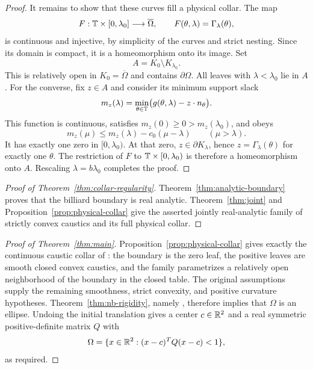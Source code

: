 \begin{proof}
It remains to show that these curves fill a physical collar.
The map
\[
 F:\mathbb{T}\times[0,\lambda_0]\longrightarrow\overline\Omega,
 \qquad F(\theta,\lambda)=\Gamma_\lambda(\theta),
\]
is continuous and injective, by simplicity of the curves and strict
nesting. Since its domain is compact, it is a homeomorphism onto its
image. Set
\[
 A=K_0\setminus K_{\lambda_0}.
\]
This is relatively open in \(K_0=\overline\Omega\) and contains
\(\partial\Omega\). All leaves with \(\lambda<\lambda_0\) lie in \(A\).
For the converse, fix \(z\in A\) and consider its minimum support slack
\[
 m_z(\lambda)
   =\min_{\theta\in\mathbb{T}}
      \bigl(g(\theta,\lambda)-z\cdot n_\theta\bigr).
\]
This function is continuous, satisfies
\(m_z(0)\geq0>m_z(\lambda_0)\), and obeys
\[
 m_z(\mu)\leq m_z(\lambda)-c_0(\mu-\lambda)
 \qquad(\mu>\lambda).
\]
It has exactly one zero in \([0,\lambda_0)\).
At that zero, \(z\in\partial K_\lambda\), hence
\(z=\Gamma_\lambda(\theta)\) for exactly one \(\theta\).
The restriction of \(F\) to \(\mathbb{T}\times[0,\lambda_0)\) is therefore a
homeomorphism onto \(A\). Rescaling \(\lambda=b\lambda_0\) completes
the proof.
\end{proof}

\begin{proof}[Proof of Theorem~\ref{thm:collar-regularity}]
Theorem~\ref{thm:analytic-boundary} proves that the billiard boundary
is real analytic. Theorem~\ref{thm:joint} and
Proposition~\ref{prop:physical-collar} give the asserted jointly
real-analytic family of strictly convex caustics and its full
physical collar.
\end{proof}

\begin{proof}[Proof of Theorem~\ref{thm:main}]
Proposition~\ref{prop:physical-collar} gives exactly the continuous
caustic collar of \cite[Definition~1.1]{NB}: the boundary is the zero
leaf, the positive leaves are smooth closed convex caustics, and the
family parametrizes a relatively open neighborhood of the boundary
in the closed table. The original assumptions supply the remaining
smoothness, strict convexity, and positive curvature hypotheses.
Theorem~\ref{thm:nb-rigidity}, namely \cite[Theorem~1.2]{NB},
therefore implies that \(\Omega\) is an ellipse. Undoing the initial
translation gives a center \(c\in\mathbb{R}^2\) and a real symmetric
positive-definite matrix \(Q\) with
\[
 \Omega=\{x\in\mathbb{R}^2:(x-c)^TQ(x-c)<1\},
\]
as required.
\end{proof}
